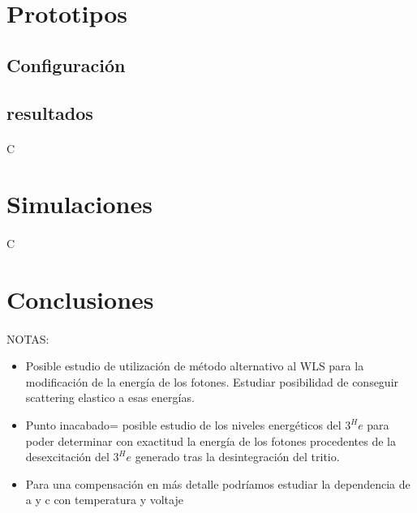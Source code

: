 \documentclass[11pt, a4paper]{article}
\begin{document}
\paragraph {}

\section {Prototipos} 
	\subsection {Configuración} 
	\subsection {resultados}
\paragraph {}
C

\section {Simulaciones}
\paragraph {}
C

\section {Conclusiones}
\paragraph {}
NOTAS:
\begin{itemize}
\item{} Posible estudio de utilización de método alternativo al WLS para la modificación de la energía de los fotones. Estudiar posibilidad de conseguir scattering elastico a esas energías.
\item {} Punto inacabado= posible estudio de los niveles energéticos del $3^He$ para poder determinar con exactitud la energía de los fotones procedentes de la desexcitación del $3^He$ generado tras la desintegración del tritio.
\item {} Para una compensación en más detalle podríamos estudiar la dependencia de a y c con temperatura y voltaje
\end{itemize}
\end{document}
